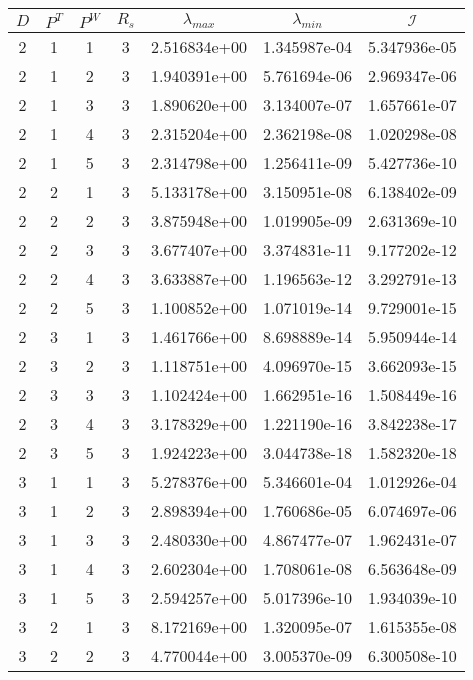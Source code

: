 \documentclass{article}
\newcommand{\cali}{\mathcal{I}}
\begin{document}
\begin{table}
\begin{center}
\begin{tabular}{|cccc|ccc|} \hline
$D$ & $P^T$  & $P^W$ & $R_s$ & $\lambda_{max}$ & $\lambda_{min}$   & $\cali$ \\
  \hline
2 & 1 & 1 & 3 & 2.516834e+00 & 1.345987e-04 & 5.347936e-05 \\ 
2 & 1 & 2 & 3 & 1.940391e+00 & 5.761694e-06 & 2.969347e-06 \\ 
2 & 1 & 3 & 3 & 1.890620e+00 & 3.134007e-07 & 1.657661e-07 \\ 
2 & 1 & 4 & 3 & 2.315204e+00 & 2.362198e-08 & 1.020298e-08 \\ 
2 & 1 & 5 & 3 & 2.314798e+00 & 1.256411e-09 & 5.427736e-10 \\ 
\hline
2 & 2 & 1 & 3 & 5.133178e+00 & 3.150951e-08 & 6.138402e-09 \\ 
2 & 2 & 2 & 3 & 3.875948e+00 & 1.019905e-09 & 2.631369e-10 \\ 
2 & 2 & 3 & 3 & 3.677407e+00 & 3.374831e-11 & 9.177202e-12 \\ 
2 & 2 & 4 & 3 & 3.633887e+00 & 1.196563e-12 & 3.292791e-13 \\ 
2 & 2 & 5 & 3 & 1.100852e+00 & 1.071019e-14 & 9.729001e-15 \\ 
\hline
2 & 3 & 1 & 3 & 1.461766e+00 & 8.698889e-14 & 5.950944e-14 \\ 
2 & 3 & 2 & 3 & 1.118751e+00 & 4.096970e-15 & 3.662093e-15 \\ 
2 & 3 & 3 & 3 & 1.102424e+00 & 1.662951e-16 & 1.508449e-16 \\ 
2 & 3 & 4 & 3 & 3.178329e+00 & 1.221190e-16 & 3.842238e-17 \\ 
2 & 3 & 5 & 3 & 1.924223e+00 & 3.044738e-18 & 1.582320e-18 \\ 
\hline
3 & 1 & 1 & 3 & 5.278376e+00 & 5.346601e-04 & 1.012926e-04 \\ 
3 & 1 & 2 & 3 & 2.898394e+00 & 1.760686e-05 & 6.074697e-06 \\ 
3 & 1 & 3 & 3 & 2.480330e+00 & 4.867477e-07 & 1.962431e-07 \\ 
3 & 1 & 4 & 3 & 2.602304e+00 & 1.708061e-08 & 6.563648e-09 \\ 
3 & 1 & 5 & 3 & 2.594257e+00 & 5.017396e-10 & 1.934039e-10 \\ 
\hline
3 & 2 & 1 & 3 & 8.172169e+00 & 1.320095e-07 & 1.615355e-08 \\ 
3 & 2 & 2 & 3 & 4.770044e+00 & 3.005370e-09 & 6.300508e-10 \\ 

\end{tabular}
\end{center}
\end{table}
\end{document}
